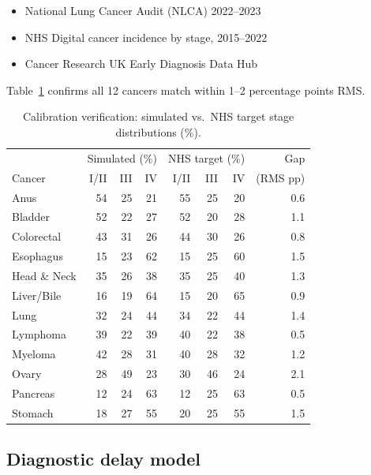 \documentclass[11pt,letter]{article}
\begin{document}
\begin{itemize}[nosep]
\item National Lung Cancer Audit (NLCA) 2022--2023 \cite{NLCA2024}
\item NHS Digital cancer incidence by stage, 2015--2022 \cite{NHSDig2020}
\item Cancer Research UK Early Diagnosis Data Hub \cite{CRUK2025}
\end{itemize}

\noindent Table~\ref{tab:calibration} confirms all 12 cancers match
within 1--2 percentage points RMS.

\begin{table}[!ht]\centering\small
\caption{Calibration verification: simulated vs.\ NHS target stage
distributions (\%).}
\label{tab:calibration}
\begin{tabular}{l rrr rrr r}\toprule
 & \multicolumn{3}{c}{Simulated (\%)} & \multicolumn{3}{c}{NHS target (\%)}
 & Gap \\
Cancer & I/II & III & IV & I/II & III & IV & (RMS pp) \\ \midrule
Anus        & 54 & 25 & 21 & 55 & 25 & 20 & 0.6 \\
Bladder     & 52 & 22 & 27 & 52 & 20 & 28 & 1.1 \\
Colorectal  & 43 & 31 & 26 & 44 & 30 & 26 & 0.8 \\
Esophagus   & 15 & 23 & 62 & 15 & 25 & 60 & 1.5 \\
Head \& Neck& 35 & 26 & 38 & 35 & 25 & 40 & 1.3 \\
Liver/Bile  & 16 & 19 & 64 & 15 & 20 & 65 & 0.9 \\
Lung        & 32 & 24 & 44 & 34 & 22 & 44 & 1.4 \\
Lymphoma    & 39 & 22 & 39 & 40 & 22 & 38 & 0.5 \\
Myeloma     & 42 & 28 & 31 & 40 & 28 & 32 & 1.2 \\
Ovary       & 28 & 49 & 23 & 30 & 46 & 24 & 2.1 \\
Pancreas    & 12 & 24 & 63 & 12 & 25 & 63 & 0.5 \\
Stomach     & 18 & 27 & 55 & 20 & 25 & 55 & 1.5 \\
\bottomrule
\end{tabular}
\end{table}


\subsection{Diagnostic delay model}
\label{sec:delay}
\end{document}
